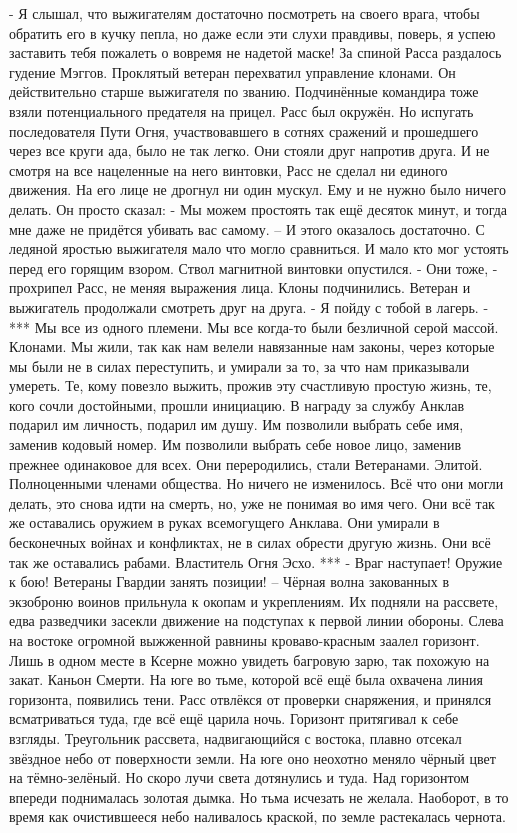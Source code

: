 \documentclass[a4paper, 12pt]{report}
\begin{document}
	- Я слышал, что выжигателям достаточно посмотреть на своего врага, чтобы обратить его в кучку пепла, но даже если эти слухи правдивы, поверь, я успею заставить тебя пожалеть о вовремя не надетой маске!
	За спиной Расса раздалось гудение Мэггов. Проклятый ветеран перехватил управление клонами. Он действительно старше выжигателя по званию. Подчинённые командира тоже взяли потенциального предателя на прицел. Расс был окружён.
Но испугать последователя Пути Огня, участвовавшего в сотнях сражений и прошедшего через все круги ада, было не так легко.
Они стояли друг напротив друга. И не смотря на все нацеленные на него винтовки, Расс не сделал ни единого движения. На его лице не дрогнул ни один мускул. Ему и не нужно было ничего делать. Он просто сказал:
	- Мы можем простоять так ещё десяток минут, и тогда мне даже не придётся убивать вас самому. –
	И этого оказалось достаточно.
	С ледяной яростью выжигателя мало что могло сравниться. И мало кто мог устоять перед его горящим взором. Ствол магнитной винтовки опустился.
	- Они тоже, - прохрипел Расс, не меняя выражения лица.
	Клоны подчинились. Ветеран и выжигатель продолжали смотреть друг на друга.
	- Я пойду с тобой в лагерь. -
***
Мы все из одного племени. Мы все когда-то были безличной серой массой. Клонами. Мы жили, так как нам велели навязанные нам законы, через которые мы были не в силах переступить, и умирали за то, за что нам приказывали умереть. Те, кому повезло выжить, прожив эту счастливую простую жизнь, те, кого сочли достойными, прошли инициацию. В награду за службу Анклав подарил им личность, подарил им душу. Им позволили выбрать себе имя, заменив кодовый номер. Им позволили выбрать себе новое лицо, заменив прежнее одинаковое для всех. Они переродились, стали Ветеранами. Элитой. Полноценными членами общества. Но ничего не изменилось. Всё что они могли делать, это снова идти на смерть, но, уже не понимая во имя чего. Они всё так же оставались оружием в руках всемогущего Анклава. Они умирали в бесконечных войнах и конфликтах, не в силах обрести другую жизнь. Они всё так же оставались рабами.
Властитель Огня Эсхо.
***
	- Враг наступает! Оружие к бою! Ветераны Гвардии занять позиции! – 
	Чёрная волна закованных в экзоброню воинов прильнула к окопам и укреплениям. Их подняли на рассвете, едва разведчики засекли движение на подступах к первой линии обороны. Слева на востоке огромной выжженной равнины кроваво-красным заалел горизонт. Лишь в одном месте в Ксерне можно увидеть багровую зарю, так похожую на закат.
	Каньон Смерти.
	На юге во тьме, которой всё ещё была охвачена линия горизонта, появились тени. Расс отвлёкся от проверки снаряжения, и принялся всматриваться туда, где всё ещё царила ночь. Горизонт притягивал к себе взгляды. Треугольник рассвета, надвигающийся с востока, плавно отсекал звёздное небо от поверхности земли. На юге оно неохотно меняло чёрный цвет на тёмно-зелёный. Но скоро лучи света дотянулись и туда. Над горизонтом впереди поднималась золотая дымка. Но тьма исчезать не желала. Наоборот, в то время как очистившееся небо наливалось краской, по земле растекалась чернота.
\end{document}
